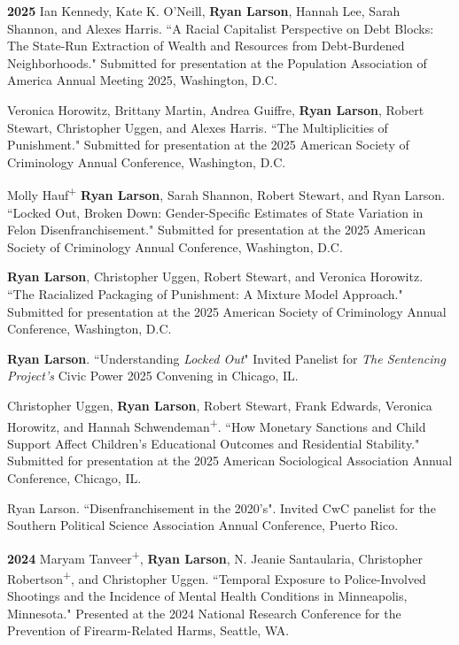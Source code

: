 \documentclass[letterpaper]{article}
\newenvironment{publist}{%
  \begin{list}{}{%
    \setlength{\leftmargin}{0cm}   %
    \setlength{\labelwidth}{2cm}     %
    \setlength{\labelsep}{0.5cm}     %
  }%
}{%
  \end{list}%
}
\begin{document}
\begin{publist}

\item [\textbf{2025}] Ian Kennedy, Kate K. O'Neill, \textbf{Ryan Larson}, Hannah Lee, Sarah Shannon, and Alexes Harris. ``A Racial Capitalist Perspective on Debt Blocks: The State-Run Extraction of Wealth and Resources from Debt-Burdened Neighborhoods." Submitted for presentation at the Population Association of America Annual Meeting 2025, Washington, D.C. 

\item Veronica Horowitz, Brittany Martin, Andrea Guiffre, \textbf{Ryan Larson}, Robert Stewart, Christopher Uggen, and Alexes Harris. ``The Multiplicities of Punishment." Submitted for presentation at the 2025 American Society of Criminology Annual Conference, Washington, D.C. 

\item Molly Hauf\textsuperscript{+} \textbf{Ryan Larson}, Sarah Shannon, Robert Stewart, and Ryan Larson. ``Locked Out, Broken Down: Gender-Specific Estimates of State Variation in Felon Disenfranchisement." Submitted for presentation at the 2025 American Society of Criminology Annual Conference, Washington, D.C. 

\item \textbf{Ryan Larson}, Christopher Uggen, Robert Stewart, and Veronica Horowitz. ``The Racialized Packaging of Punishment: A Mixture Model Approach." Submitted for presentation at the 2025 American Society of Criminology Annual Conference, Washington, D.C. 

\item \textbf{Ryan Larson}. ``Understanding \textit{Locked Out}" Invited Panelist for \textit{The Sentencing Project's} Civic Power 2025 Convening in Chicago, IL. 

\item Christopher Uggen, \textbf{Ryan Larson}, Robert Stewart, Frank Edwards, Veronica Horowitz, and Hannah Schwendeman\textsuperscript{+}. ``How Monetary Sanctions and Child Support Affect Children's Educational Outcomes and Residential Stability." Submitted for presentation at the 2025 American Sociological Association Annual Conference, Chicago, IL. 

\item Ryan Larson. ``Disenfranchisement in the 2020's". Invited CwC panelist for the Southern Political Science Association Annual Conference, Puerto Rico. 

\item[\textbf{2024}] Maryam Tanveer\textsuperscript{+}, \textbf{Ryan Larson}, N. Jeanie Santaularia, Christopher Robertson\textsuperscript{+}, and Christopher Uggen. ``Temporal Exposure to Police-Involved Shootings and the Incidence of Mental Health Conditions in Minneapolis, Minnesota." Presented at the 2024 National Research Conference for the Prevention of Firearm-Related Harms, Seattle, WA. 


\end{publist}
\end{document}
